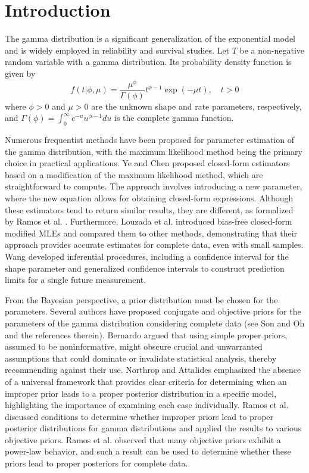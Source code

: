 \documentclass[]{interact}
\theoremstyle{plain}%
\theoremstyle{definition}
\theoremstyle{remark}
\begin{document}
\section{Introduction}



The gamma distribution is a significant generalization of the exponential model and is widely employed in reliability and survival studies. Let $T$ be a non-negative random variable with a gamma distribution. Its probability density function is given by
\begin{equation}\label{fdpgamma}
f(t|\phi,\mu)= \frac{\mu^\phi}{\Gamma(\phi)}t^{\phi-1}\exp(-\mu t) ,\quad t>0
\end{equation}
where $\phi>0$ and $\mu>0$ are the unknown shape and rate parameters, respectively, and $\Gamma(\phi)=\int_{0}^{\infty}{e^{-u}u^{\phi-1}du}$ is the complete gamma function. 

Numerous frequentist methods have been proposed for parameter estimation of the gamma distribution, with the maximum likelihood method being the primary choice in practical applications. {\color{black} Ye and Chen \cite{ye2017closed} proposed closed-form estimators based on a modification of the maximum likelihood method, which are straightforward to compute. The approach involves introducing a new parameter, where the new equation allows for obtaining closed-form expressions. Although these estimators tend to return similar results, they are different, as formalized by Ramos et al. \cite{ramos2023asymptotic}. Furthermore, Louzada et al. \cite{louzada2019note} introduced bias-free closed-form modified MLEs and compared them to other methods, demonstrating that their approach provides accurate estimates for complete data, even with small samples.} Wang \cite{wang2018inference} developed inferential procedures, including a confidence interval for the shape parameter and generalized confidence intervals to construct prediction limits for a single future measurement. 

From the Bayesian perspective, a prior distribution must be chosen for the parameters. Several authors have proposed conjugate and objective priors for the parameters of the gamma distribution considering complete data (see Son and Oh \cite{son2006bayesian} and the references therein). Bernardo \cite{bernardo2005} argued that using simple proper priors, assumed to be noninformative, might obscure crucial and unwarranted assumptions that could dominate or invalidate statistical analysis, thereby recommending against their use. Northrop and Attalides \cite{northrop2016} emphasized the absence of a universal framework that provides clear criteria for determining when an improper prior leads to a proper posterior distribution in a specific model, highlighting the importance of examining each case individually. Ramos et al. \cite{ramos2021posterior} discussed conditions to determine whether improper priors lead to proper posterior distributions for gamma distributions and applied the results to various objective priors. Ramos et al. \cite{ramos2020power} observed that many objective priors exhibit a power-law behavior, and such a result can be used to determine whether these priors lead to proper posteriors for complete data.
\end{document}
